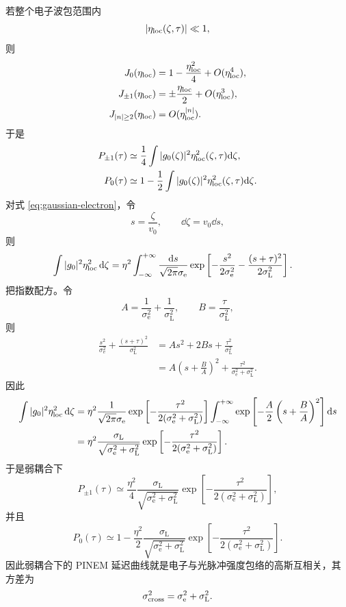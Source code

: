 若整个电子波包范围内
\begin{equation}
{|\eta_{\rm loc}(\zeta,\tau)|\ll1,}
\label{eq:weak-coupling-special}
\end{equation}
则
\begin{align}
J_0(\eta_{\rm loc})&=1-\frac{\eta_{\rm loc}^2}{4}+O(\eta_{\rm loc}^4),\\
J_{\pm1}(\eta_{\rm loc})&=\pm\frac{\eta_{\rm loc}}{2}+O(\eta_{\rm loc}^3),\\
J_{|n|\ge2}(\eta_{\rm loc})&=O(\eta_{\rm loc}^{|n|}).
\end{align}
于是
\begin{align}
P_{\pm1}(\tau)
&\simeq
\frac14
\int |g_0(\zeta)|^2\eta_{\rm loc}^2(\zeta,\tau)\mathrm{d}\zeta,\\
P_0(\tau)
&\simeq
1-\frac12
\int |g_0(\zeta)|^2\eta_{\rm loc}^2(\zeta,\tau)\mathrm{d}\zeta.
\label{eq:weak-prob-general}
\end{align}
对式 \cref{eq:gaussian-electron}，令
\[
s=\frac{\zeta}{v_0},
\qquad
\dd\zeta=v_0\dd s,
\]
则
\begin{align}
\int |g_0|^2\eta_{\rm loc}^2\,\mathrm{d}\zeta
&=
\eta^2
\int_{-\infty}^{+\infty}
\frac{\mathrm{d} s}{\sqrt{2\pi}\sigma_{\mathrm e}}
\exp\left[
-\frac{s^2}{2\sigma_{\mathrm e}^2}
-\frac{(s+\tau)^2}{2\sigma_{\mathrm L}^2}
\right].
\end{align}
把指数配方。令
\[
A=\frac{1}{\sigma_{\mathrm e}^2}
+\frac{1}{\sigma_{\mathrm L}^2},
\qquad
B=\frac{\tau}{\sigma_{\mathrm L}^2},
\]
则
\begin{align}
\frac{s^2}{\sigma_{\mathrm e}^2}
+\frac{(s+\tau)^2}{\sigma_{\mathrm L}^2}
&=
As^2+2Bs+\frac{\tau^2}{\sigma_{\mathrm L}^2}\\
&=
A\left(s+\frac{B}{A}\right)^2
+\frac{\tau^2}{\sigma_{\mathrm e}^2+\sigma_{\mathrm L}^2}.
\end{align}
因此
\begin{align}
\int |g_0|^2\eta_{\rm loc}^2\,\mathrm{d}\zeta
&=
\eta^2
\frac{1}{\sqrt{2\pi}\sigma_{\mathrm e}}
\exp\left[
-\frac{\tau^2}{2(\sigma_{\mathrm e}^2+\sigma_{\mathrm L}^2)}
\right]
\int_{-\infty}^{+\infty}
\exp\left[
-\frac{A}{2}\left(s+\frac{B}{A}\right)^2
\right]\mathrm{d} s\\
&=
\eta^2
\frac{\sigma_{\mathrm L}}
{\sqrt{\sigma_{\mathrm e}^2+\sigma_{\mathrm L}^2}}
\exp\left[
-\frac{\tau^2}
{2(\sigma_{\mathrm e}^2+\sigma_{\mathrm L}^2)}
\right].
\label{eq:gaussian-overlap}
\end{align}
于是弱耦合下
\begin{equation}
{
P_{\pm1}(\tau)
\simeq
\frac{\eta^2}{4}
\frac{\sigma_{\mathrm L}}
{\sqrt{\sigma_{\mathrm e}^2+\sigma_{\mathrm L}^2}}
\exp\left[
-\frac{\tau^2}
{2(\sigma_{\mathrm e}^2+\sigma_{\mathrm L}^2)}
\right],}
\label{eq:P1-gaussian-weak}
\end{equation}
并且
\begin{equation}
{
P_0(\tau)
\simeq
1-
\frac{\eta^2}{2}
\frac{\sigma_{\mathrm L}}
{\sqrt{\sigma_{\mathrm e}^2+\sigma_{\mathrm L}^2}}
\exp\left[
-\frac{\tau^2}
{2(\sigma_{\mathrm e}^2+\sigma_{\mathrm L}^2)}
\right].}
\label{eq:P0-gaussian-weak}
\end{equation}
因此弱耦合下的 PINEM 延迟曲线就是电子与光脉冲强度包络的高斯互相关，其方差为
\[
\sigma_{\rm cross}^2
=\sigma_{\mathrm e}^2+\sigma_{\mathrm L}^2.
\]


